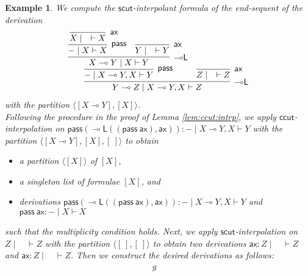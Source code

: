 \documentclass[sn-mathphys-num]{sn-jnl}%
\newcommand{\GG}{\Gamma}
\newcommand{\GD}{\Delta}
\newcommand{\GL}{\Lambda}
\newcommand{\GO}{\Omega}
\newcommand{\vd}{\vdash}
\newcommand{\pass}{\mathsf{pass}}
\newcommand{\ax}{\mathsf{ax}}
\newcommand{\ot}{\otimes}
\newcommand{\lolli}{\multimap}
\newcommand{\lleft}{{\lolli}\mathsf{L}}
\newcommand{\mf}[1]{\mathsf{#1}}
\newcommand{\gs}[1]{\sigma_{X} (#1)}
\theoremstyle{thmstyleone}%
\theoremstyle{thmstyletwo}%
\newtheorem{example}[theorem]{Example}%
\theoremstyle{thmstylethree}%
\begin{document}
\begin{example}
  We compute the $\mf{scut}$-interpolant formula of the end-sequent of the derivation 
  \begin{displaymath}
    \begin{array}{c}
      \infer[\lleft]{Y \lolli Z \mid X \lolli Y , X \vd Z}{
        \infer[\pass]{{-} \mid X \lolli Y ,X \vd Y}{
          \infer[\lleft]{X \lolli Y \mid X \vd Y}{
            \infer[\pass]{{-} \mid X \vd X}{
              \infer[\ax]{X \mid \quad \vd X}{}
            }
            &
            \infer[\ax]{Y \mid \quad \vd Y}{}
          }
        }
        &
        \infer[\ax]{Z \mid \quad \vd Z}{}
      }
    \end{array}
  \end{displaymath}
  with the partition $\langle [X \lolli Y] , [X]\rangle$.
  \\
  Following the procedure in the proof of Lemma \ref{lem:ccut:intrp}, we apply $\mf{ccut}$-interpolation on $\pass (\lleft ((\pass \ \ax), \ax)) : {-} \mid X \lolli Y , X \vd Y$ with the partition $\langle [X \lolli Y] , [X] , [\ ] \rangle$ to obtain
  \begin{itemize}
    \item[--] a partition $\langle [X] \rangle$ of $[X]$,
    \item[--] a singleton list of formulae $[X]$, and
    \item[--] derivations $\pass (\lleft ((\pass \ \ax), \ax)) : {-} \mid X \lolli Y , X \vd Y$ and $ \pass \ \ax : {-} \mid X \vd X$ 
  \end{itemize}
  such that the multiplicity condition holds.
  Next, we apply $\mf{scut}$-interpolation on $Z \mid \quad \vd Z$ with the partition $\langle [\ ] , [\ ] \rangle$ to obtain two derivations $\ax : Z \mid \quad \vd Z$ and $\ax : Z \mid \quad \vd Z$.
  Then we construct the desired derivations as follows:
  \begin{displaymath}
    \begin{array}{c}
      \begin{array}{c}
        g
      \end{array}
      \quad

\end{array}
\end{displaymath}
\end{example}
\end{document}
